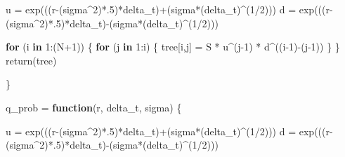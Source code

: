 \documentclass[
]{article}
\newenvironment{Shaded}{\begin{snugshade}}{\end{snugshade}}
\newcommand{\ControlFlowTok}[1]{\textcolor[rgb]{0.13,0.29,0.53}{\textbf{#1}}}
\newcommand{\DecValTok}[1]{\textcolor[rgb]{0.00,0.00,0.81}{#1}}
\newcommand{\FunctionTok}[1]{\textcolor[rgb]{0.00,0.00,0.00}{#1}}
\newcommand{\NormalTok}[1]{#1}
\newcommand{\OtherTok}[1]{\textcolor[rgb]{0.56,0.35,0.01}{#1}}
\newcommand{\SpecialCharTok}[1]{\textcolor[rgb]{0.00,0.00,0.00}{#1}}
\begin{document}
\begin{Shaded}
\begin{Highlighting}[]
\NormalTok{  u }\OtherTok{=} \FunctionTok{exp}\NormalTok{(((r}\SpecialCharTok{{-}}\NormalTok{(sigma}\SpecialCharTok{\^{}}\DecValTok{2}\NormalTok{)}\SpecialCharTok{*}\NormalTok{.}\DecValTok{5}\NormalTok{)}\SpecialCharTok{*}\NormalTok{delta\_t)}\SpecialCharTok{+}\NormalTok{(sigma}\SpecialCharTok{*}\NormalTok{(delta\_t)}\SpecialCharTok{\^{}}\NormalTok{(}\DecValTok{1}\SpecialCharTok{/}\DecValTok{2}\NormalTok{)))}
\NormalTok{  d }\OtherTok{=} \FunctionTok{exp}\NormalTok{(((r}\SpecialCharTok{{-}}\NormalTok{(sigma}\SpecialCharTok{\^{}}\DecValTok{2}\NormalTok{)}\SpecialCharTok{*}\NormalTok{.}\DecValTok{5}\NormalTok{)}\SpecialCharTok{*}\NormalTok{delta\_t)}\SpecialCharTok{{-}}\NormalTok{(sigma}\SpecialCharTok{*}\NormalTok{(delta\_t)}\SpecialCharTok{\^{}}\NormalTok{(}\DecValTok{1}\SpecialCharTok{/}\DecValTok{2}\NormalTok{)))}
  
  \ControlFlowTok{for}\NormalTok{ (i }\ControlFlowTok{in} \DecValTok{1}\SpecialCharTok{:}\NormalTok{(N}\SpecialCharTok{+}\DecValTok{1}\NormalTok{)) \{}
    \ControlFlowTok{for}\NormalTok{ (j }\ControlFlowTok{in} \DecValTok{1}\SpecialCharTok{:}\NormalTok{i) \{}
\NormalTok{      tree[i,j] }\OtherTok{=}\NormalTok{ S }\SpecialCharTok{*}\NormalTok{ u}\SpecialCharTok{\^{}}\NormalTok{(j}\DecValTok{{-}1}\NormalTok{) }\SpecialCharTok{*}\NormalTok{ d}\SpecialCharTok{\^{}}\NormalTok{((i}\DecValTok{{-}1}\NormalTok{)}\SpecialCharTok{{-}}\NormalTok{(j}\DecValTok{{-}1}\NormalTok{))}
\NormalTok{    \}}
\NormalTok{  \}}
  \FunctionTok{return}\NormalTok{(tree)}
  
\NormalTok{\}}

\NormalTok{q\_prob }\OtherTok{=} \ControlFlowTok{function}\NormalTok{(r, delta\_t, sigma) \{}
  
\NormalTok{  u }\OtherTok{=} \FunctionTok{exp}\NormalTok{(((r}\SpecialCharTok{{-}}\NormalTok{(sigma}\SpecialCharTok{\^{}}\DecValTok{2}\NormalTok{)}\SpecialCharTok{*}\NormalTok{.}\DecValTok{5}\NormalTok{)}\SpecialCharTok{*}\NormalTok{delta\_t)}\SpecialCharTok{+}\NormalTok{(sigma}\SpecialCharTok{*}\NormalTok{(delta\_t)}\SpecialCharTok{\^{}}\NormalTok{(}\DecValTok{1}\SpecialCharTok{/}\DecValTok{2}\NormalTok{)))}
\NormalTok{  d }\OtherTok{=} \FunctionTok{exp}\NormalTok{(((r}\SpecialCharTok{{-}}\NormalTok{(sigma}\SpecialCharTok{\^{}}\DecValTok{2}\NormalTok{)}\SpecialCharTok{*}\NormalTok{.}\DecValTok{5}\NormalTok{)}\SpecialCharTok{*}\NormalTok{delta\_t)}\SpecialCharTok{{-}}\NormalTok{(sigma}\SpecialCharTok{*}\NormalTok{(delta\_t)}\SpecialCharTok{\^{}}\NormalTok{(}\DecValTok{1}\SpecialCharTok{/}\DecValTok{2}\NormalTok{)))}
  

\end{Highlighting}
\end{Shaded}
\end{document}

